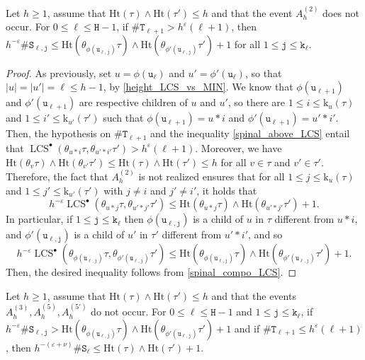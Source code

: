 \documentclass[11pt,reqno]{amsart}
\newcommand{\1}{\mathbf{1}}
\newcommand{\0}{\mathbf{0}}
\newcommand{\ttS}{\mathtt{S}}
\newcommand{\ttT}{\mathtt{T}}
\newcommand{\ttH}{\mathtt{H}}
\newcommand{\ttj}{\mathtt{j}}
\newcommand{\ttk}{\mathtt{k}}
\newcommand{\ttu}{\mathtt{u}}
\newcommand{\Ht}{\mathrm{Ht}}
\newcommand{\rk}{\mathrm{k}}
\newcommand{\LCS}{\operatorname{LCS}}
\newcommand{\eps}{\varepsilon}
\begin{document}
\begin{lem}
\label{lem:A1_cases}
Let $h\geq 1$, assume that $\Ht(\tau)\wedge\Ht(\tau')\leq h$ and that the event $A_h^{(2)}$ does not occur. For $0\leq \ell\leq \ttH-1$, if $\# \ttT_{\ell+1}> h^\varepsilon (\ell+1)$, then $h^{-\varepsilon}\# \ttS_{\ell,\ttj} \leq  \Ht(\theta_{\phi(\ttu_{\ell,\ttj})}\tau)\wedge \Ht(\theta_{\phi'(\ttu_{\ell,\ttj})}\tau')+1$ for all $1\leq \ttj\leq \ttk_\ell$.
\end{lem}

\begin{proof}
As previously, set $u=\phi(\ttu_\ell)$ and $u'=\phi'(\ttu_\ell)$, so that $|u|=|u'|=\ell\leq h-1$, by \eqref{height_LCS_vs_MIN}. We know that $\phi(\ttu_{\ell+1})$ and $\phi'(\ttu_{\ell+1})$ are respective children of $u$ and $u'$, so there are $1\leq i\leq \rk_u(\tau)$ and $1\leq i'\leq \rk_{u'}(\tau')$ such that $\phi(\ttu_{\ell+1})=u*i$ and $\phi'(\ttu_{\ell+1})=u'*i'$. Then, the hypothesis on $\#\ttT_{\ell+1}$ and the inequality \eqref{spinal_above_LCS} entail that $\LCS^\bullet(\theta_{u*i}\tau,\theta_{u'*i'}\tau')> h^\varepsilon(\ell+1)$. Moreover, we have $\Ht(\theta_v\tau)\wedge \Ht(\theta_{v'}\tau')\leq \Ht(\tau)\wedge\Ht(\tau')\leq h$ for all $v\in\tau$ and $v'\in\tau'$. Therefore, the fact that $A_h^{(2)}$ is not realized ensures that for all $1\leq j\leq \rk_u(\tau)$ and $1\leq j'\leq \rk_{u'}(\tau')$ with $j\neq i$ and $j'\neq i'$, it holds that 
\[h^{-\varepsilon}\LCS^\bullet(\theta_{u*j}\tau,\theta_{u'*j'}\tau')\leq \Ht(\theta_{u*j}\tau)\wedge\Ht(\theta_{u'*j'}\tau')+1.\]
In particular, if $1\leq \ttj\leq \ttk_\ell$ then $\phi(\ttu_{\ell,\ttj})$ is a child of $u$ in $\tau$ different from $u*i$, and $\phi'(\ttu_{\ell,\ttj})$ is a child of $u'$ in $\tau'$ different from $u'*i'$, and so \[h^{-\varepsilon}\LCS^\bullet(\theta_{\phi(\ttu_{\ell,\ttj})}\tau,\theta_{\phi'(\ttu_{\ell,\ttj})}\tau')\leq \Ht(\theta_{\phi(\ttu_{\ell,\ttj})}\tau)\wedge\Ht(\theta_{\phi'(\ttu_{\ell,\ttj})}\tau')+1.\]
Then, the desired inequality follows from \eqref{spinal_compo_LCS}.
\end{proof}

\begin{lem}
\label{lem:A2_cases}
Let $h\geq 1$, assume that $\Ht(\tau)\wedge\Ht(\tau')\leq h$ and that the events $A_h^{(3)},A_h^{(5)},A_h^{(5')}$ do not occur. For $0\leq \ell \leq \ttH-1$ and $1\leq \ttj\leq \ttk_\ell$, if $h^{-\varepsilon}\# \ttS_{\ell,\ttj} > \Ht(\theta_{\phi(\ttu_{\ell,\ttj})}\tau)\wedge \Ht(\theta_{\phi'(\ttu_{\ell,\ttj})}\tau')+1$ and if $\#\ttT_{\ell+1}\leq h^\varepsilon(\ell+1)$, then $h^{-(\eps+\nu)}\# \ttS_\ell\leq \Ht(\tau)\wedge\Ht(\tau')+1$.
\end{lem}
\end{document}

